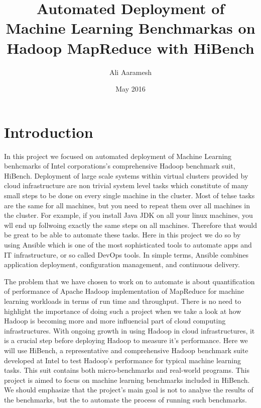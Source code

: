 \documentclass[12pt, letterpaper]{article}
\title{Automated Deployment of Machine Learning Benchmarkas on Hadoop MapReduce with HiBench}
\author{Ali Aaramesh}
\date{May 2016}
\begin{document}
\maketitle

\section{Introduction}
In this project we focused on automated deployment of Machine Learning benhcmarks of Intel corporations's comprehensive Hadoop benchmark suit, HiBench. \cite{hibench2} Deployment of large scale systems within virtual clusters provided by cloud infrastructure are non trivial system level tasks which constitute of many small steps to be done on every single machine in the cluster. Most of tehse tasks are the same for all machines, but you need to repeat them over all machines in the cluster. For example, if you install Java JDK on all your linux machines, you wll end up follwoing exactly the same steps on all machines. Therefore that would be great to be able to automate these tasks. Here in this project we do so by using Ansible which is one of the most sophisticated tools to automate apps and IT infrastructure, or so called DevOps tools. In simple terms, Ansible combines application deployment, configuration management, and continuous delivery.

The problem that we have chosen to work on to automate is about quantification of performance of Apache Hadoop implementation of MapReduce for machine learning workloads in terms of run time and throughput. There is no need to highlight the importance of doing such a project when we take a look at how Hadoop is becoming more and more influencial part of cloud computing infrastructures. With ongoing growth in using Hadoop in cloud infrastructures, it is a crucial step before deploying Hadoop to measure it's performance. Here we will use HiBench, a representative and comprehensive Hadoop benchmark suite developed at Intel \cite{hibench3} to test Hadoop's performance for typical machine learning tasks. This suit contains both micro-benchmarks and real-world programs. This project is aimed to focus on machine learning benchmarks included in HiBench. We should emphasize that the project's main goal is not to analyse the results of the benchmarks, but the to automate the process of running such benchmarks. 
\end{document}
